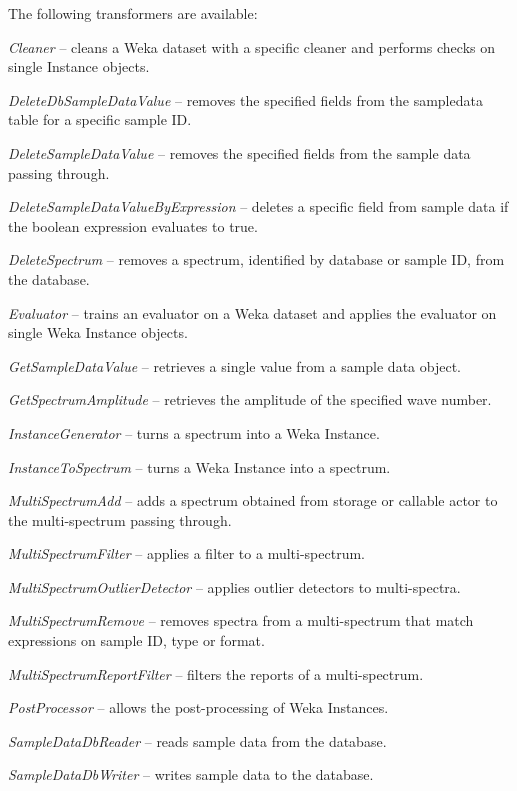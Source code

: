 \documentclass[a4paper]{book}
\begin{document}
The following transformers are available:
\begin{tight_itemize}
  \item \textit{Cleaner} -- cleans a Weka dataset with a specific cleaner
  and performs checks on single Instance objects.
  \item \textit{DeleteDbSampleDataValue} -- removes the specified fields
  from the sampledata table for a specific sample ID.
  \item \textit{DeleteSampleDataValue} -- removes the specified fields
  from the sample data passing through.
  \item \textit{DeleteSampleDataValueByExpression} -- deletes a specific
  field from sample data if the boolean expression evaluates to true.
  \item \textit{DeleteSpectrum} -- removes a spectrum, identified by
  database or sample ID, from the database.
  \item \textit{Evaluator} -- trains an evaluator on a Weka dataset and
  applies the evaluator on single Weka Instance objects.
  \item \textit{GetSampleDataValue} -- retrieves a single value from a
  sample data object.
  \item \textit{GetSpectrumAmplitude} -- retrieves the amplitude of the
  specified wave number.
  \item \textit{InstanceGenerator} -- turns a spectrum into a Weka Instance.
  \item \textit{InstanceToSpectrum} -- turns a Weka Instance into a spectrum.
  \item \textit{MultiSpectrumAdd} -- adds a spectrum obtained from storage or
  callable actor to the multi-spectrum passing through.
  \item \textit{MultiSpectrumFilter} -- applies a filter to a multi-spectrum.
  \item \textit{MultiSpectrumOutlierDetector} -- applies outlier detectors
  to multi-spectra.
  \item \textit{MultiSpectrumRemove} -- removes spectra from a multi-spectrum
  that match expressions on sample ID, type or format.
  \item \textit{MultiSpectrumReportFilter} -- filters the reports of a
  multi-spectrum.
  \item \textit{PostProcessor} -- allows the post-processing of Weka Instances.
  \item \textit{SampleDataDbReader} -- reads sample data from the database.
  \item \textit{SampleDataDbWriter} -- writes sample data to the database.

\end{tight_itemize}
\end{document}
